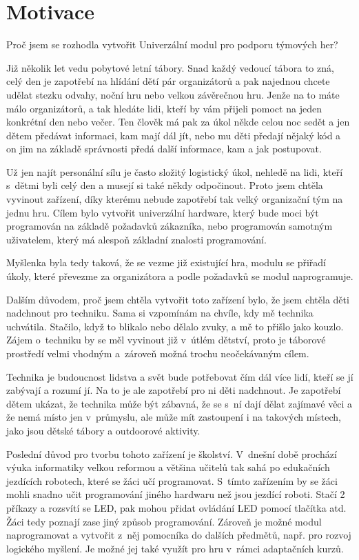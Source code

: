 \chapter{Motivace}
Proč jsem se rozhodla vytvořit Univerzální modul pro podporu týmových her? 

Již několik let vedu pobytové letní tábory. Snad každý vedoucí tábora to zná, celý den je zapotřebí na hlídání dětí pár organizátorů 
a pak najednou chcete udělat stezku odvahy, noční hru nebo velkou závěrečnou hru. Jenže na to máte málo organizátorů, a tak hledáte lidi, 
kteří by vám přijeli pomoct na jeden konkrétní den nebo večer. Ten člověk má pak za úkol někde celou noc sedět a jen dětem předávat 
informaci, kam mají dál jít, nebo mu děti předají nějaký kód a on jim na základě správnosti předá další informace, kam a jak postupovat. 

Už jen najít personální sílu je často složitý logistický úkol, nehledě na lidi, kteří s~dětmi byli celý den a musejí si také někdy 
odpočinout. Proto jsem chtěla vyvinout zařízení, díky kterému nebude zapotřebí tak velký organizační tým na jednu hru. Cílem bylo vytvořit 
univerzální hardware, který bude moci být programován na základě požadavků zákazníka, nebo programován samotným uživatelem, který má alespoň 
základní znalosti programování. 

Myšlenka byla tedy taková, že se vezme již existující hra, modulu se přiřadí úkoly, které převezme za organizátora a podle požadavků se 
modul naprogramuje. 

Dalším důvodem, proč jsem chtěla vytvořit toto zařízení bylo, že jsem chtěla děti nadchnout pro techniku. Sama si vzpomínám na chvíle, kdy
mě technika uchvátila. Stačilo, když to blikalo nebo dělalo zvuky, a mě to přišlo jako kouzlo. Zájem o~techniku by se měl vyvinout již v~útlém 
dětství, proto je táborové prostředí velmi vhodným a~zároveň možná trochu neočekávaným cílem. 

Technika je budoucnost lidstva a svět bude potřebovat čím dál více lidí, kteří se jí zabývají a rozumí jí. Na to je ale zapotřebí pro ni děti 
nadchnout. Je zapotřebí dětem ukázat, že technika může být zábavná, že se s~ní dají dělat zajímavé věci a že nemá místo jen v~průmyslu, ale může 
mít zastoupení i na takových místech, jako jsou dětské tábory a outdoorové aktivity.  

Poslední důvod pro tvorbu tohoto zařízení je školství. V~dnešní době prochází výuka informatiky velkou reformou a většina učitelů tak sahá po 
edukačních jezdících robotech, které se žáci učí programovat. S~tímto zařízením by se žáci mohli snadno učit programování jiného hardwaru než jsou 
jezdící roboti. 
Stačí 2 příkazy a rozsvítí se LED, pak mohou přidat ovládání LED pomocí tlačítka atd. Žáci tedy poznají zase jiný způsob programování.
Zároveň je možné modul naprogramovat a vytvořit z~něj pomocníka do dalších předmětů, např. pro rozvoj 
logického myšlení. Je možné jej také využít pro hru v~rámci adaptačních kurzů. 


